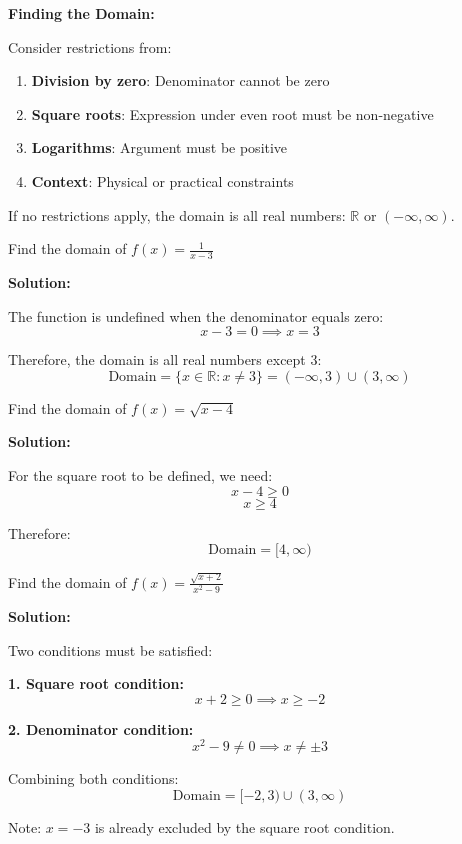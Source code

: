 \documentclass[12pt,a4paper]{article}
\begin{document}
\begin{strategy}
\textbf{Finding the Domain:}

Consider restrictions from:
\begin{enumerate}
    \item \textbf{Division by zero}: Denominator cannot be zero
    \item \textbf{Square roots}: Expression under even root must be non-negative
    \item \textbf{Logarithms}: Argument must be positive
    \item \textbf{Context}: Physical or practical constraints
\end{enumerate}

If no restrictions apply, the domain is all real numbers: $\mathbb{R}$ or $(-\infty, \infty)$.
\end{strategy}

\begin{example}
Find the domain of $f(x) = \frac{1}{x-3}$

\textbf{Solution:}

The function is undefined when the denominator equals zero:
\[
x - 3 = 0 \implies x = 3
\]

Therefore, the domain is all real numbers except 3:
\[
\text{Domain} = \{x \in \mathbb{R} : x \neq 3\} = (-\infty, 3) \cup (3, \infty)
\]
\end{example}

\begin{example}
Find the domain of $f(x) = \sqrt{x - 4}$

\textbf{Solution:}

For the square root to be defined, we need:
\[
x - 4 \geq 0
\]
\[
x \geq 4
\]

Therefore:
\[
\text{Domain} = [4, \infty)
\]
\end{example}

\begin{example}
Find the domain of $f(x) = \frac{\sqrt{x+2}}{x^2-9}$

\textbf{Solution:}

Two conditions must be satisfied:

\textbf{1. Square root condition:}
\[
x + 2 \geq 0 \implies x \geq -2
\]

\textbf{2. Denominator condition:}
\[
x^2 - 9 \neq 0 \implies x \neq \pm 3
\]

Combining both conditions:
\[
\text{Domain} = [-2, 3) \cup (3, \infty)
\]

Note: $x = -3$ is already excluded by the square root condition.
\end{example}
\end{document}
